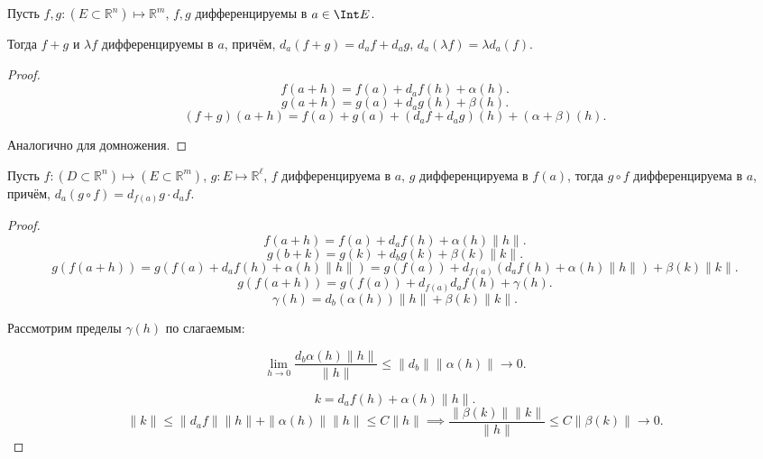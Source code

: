 \begin{theorem} \thmslashn

    Пусть $f, g : (E \subset \mathbb{R}^{n}) \mapsto \mathbb{R}^{m}$, $f, g$ дифференцируемы в $a\in \Int E$.

    Тогда $f+g$ и $\lambda f$ дифференцируемы в $a$, причём, $d_{a}(f+g) = d_{a}f + d_{a} g$, $d_{a}(\lambda f) = \lambda d_{a}(f)$.
    \begin{proof} \thmslashn
    
        \[ f(a+h) = f(a) + d_{a}f(h) + \alpha(h) .\]
        \[ g(a+h) = g(a) + d_{a}g(h) + \beta(h) .\]
        \[ (f+g)(a+h) = f(a) + g(a) + (d_{a}f + d_{a}g)(h) + (\alpha + \beta)(h) .\]
        
        Аналогично для домножения.
    \end{proof}
\end{theorem}
\begin{theorem} \thmslashn

    Пусть $f : (D \subset  \mathbb{R}^{n}) \mapsto (E \subset \mathbb{R}^{m})$, $g : E \mapsto \mathbb{R}^{\ell}$, $f$ дифференцируема в $a$, $g$ дифференцируема в  $f(a)$, тогда  $g \circ f$ дифференцируема в  $a$, причём, $d_{a}(g \circ f) = d_{f(a)}g \cdot d_{a}f$.
    \begin{proof} \thmslashn
    
        \[ f(a+h) = f(a) + d_{a}f(h) + \alpha(h)\|h\| .\]
        \[ g(b+k) = g(k) + d_{b}g(k) + \beta(k)\|k\| .\] 
        \[ g(f(a+h)) = g(f(a) + d_{a}f(h) + \alpha(h)\|h\|) = g(f(a)) + d_{f(a)}(d_{a}f(h) + \alpha(h)\|h\|) + \beta(k)\|k\| .\]
        \[ g(f(a+h)) = g(f(a)) + d_{f(a)}d_{a}f(h) + \gamma(h).\]
        \[ \gamma(h) = d_{b}(\alpha(h))\|h\| + \beta(k)\|k\|.\]

        Рассмотрим пределы $\gamma(h)$ по слагаемым:

        \[ \lim\limits_{h \to 0} \frac{d_{b}\alpha(h) \|h\|}{\|h\|} \le \|d_{b}\|\|\alpha(h)\| \to 0 .\]

        \[ k = d_{a}f(h) + \alpha(h)\|h\| .\]
        \[ \|k\| \le \|d_{a}f\|\|h\| + \|\alpha(h)\|\|h\| \le C \|h\| \implies \frac{\|\beta(k)\| \|k\|}{\|h\|} \le C \|\beta(k)\| \to 0.\]
    \end{proof}
\end{theorem}
